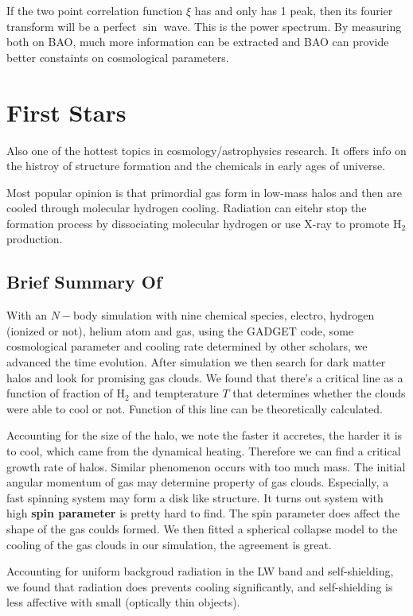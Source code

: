\documentclass[11pt]{article}
\begin{document}
If the two point correlation function $\xi$ has and only has 1 peak, then its fourier transform will be a perfect $\sin$ wave. This is the power spectrum. By measuring both on BAO, much more information can be extracted and BAO can provide better constaints on cosmological parameters.

\section{First Stars}
Also one of the hottest topics in cosmology/astrophysics research. It offers info on the histroy of structure formation and the chemicals in early ages of universe. 

Most popular opinion is that primordial gas form in low-mass halos and then are cooled through molecular hydrogen cooling. Radiation can eitehr stop the formation process by dissociating molecular hydrogen or use X-ray to promote $\text{H}_2$ production. 

\subsection{Brief Summary Of \cite{naoki03a}}
With an $N-$body simulation with nine chemical species, electro, hydrogen (ionized or not), helium atom and gas, using the GADGET code, some cosmological parameter and cooling rate determined by other scholars, we advanced the time evolution. 
After simulation we then search for dark matter halos and look for promising gas clouds. We found that there's a critical line as a function of fraction of $\text{H}_2$ and tempterature $T$ that determines whether the clouds were able to cool or not. 
Function of this line can be theoretically calculated. 

Accounting for the size of the halo, we note the faster it accretes, the harder it is to cool, which came from the dynamical heating. Therefore we can find a critical growth rate of halos. Similar phenomenon occurs with too much mass. 
The initial angular momentum of gas may determine property of gas clouds. Especially, a fast spinning system may form a disk like structure. It turns out system with high \textbf{spin parameter} is pretty hard to find. The spin parameter does affect the shape of the gas
 coulds formed. 
We then fitted a spherical collapse model to the cooling of the gas clouds in our simulation, the agreement is great. 

Accounting for uniform backgroud radiation in the LW band and self-shielding, we found that radiation does prevents cooling significantly, and self-shielding is less affective with small (optically thin objects). 
\end{document}
